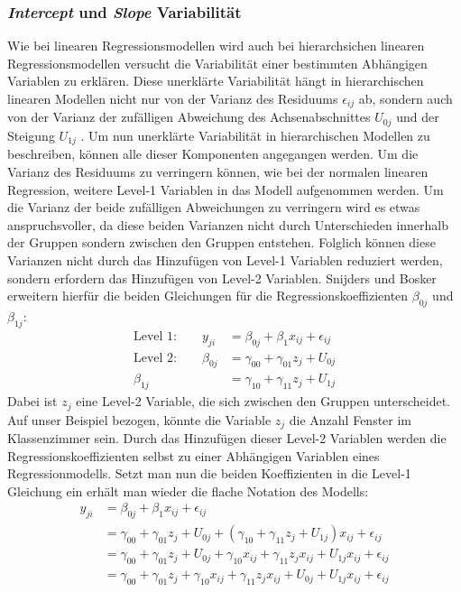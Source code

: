 \documentclass[12pt]{article}\usepackage[]{graphicx}\usepackage[]{color}
\numberwithin{equation}{section}
\begin{document}
\subsubsection{\textit{Intercept} und \textit{Slope} Variabilität}
Wie bei linearen Regressionsmodellen wird auch bei hierarchsichen linearen Regressionsmodellen versucht die Variabilität einer bestimmten Abhängigen Variablen zu erklären. Diese unerklärte Variabilität hängt in hierarchischen linearen Modellen nicht nur von der Varianz des Residuums $\epsilon_{ij}$ ab, sondern auch von der Varianz der zufälligen Abweichung des Achsenabschnittes $U_{0j}$ und der Steigung $U_{1j}$ \citep{SnijdersTomA.B2012Ma:a}. Um nun unerklärte Variabilität in hierarchischen Modellen zu beschreiben, können alle dieser Komponenten angegangen werden. Um die Varianz des Residuums zu verringern können, wie bei der normalen linearen Regression, weitere Level-1 Variablen in das Modell aufgenommen werden. Um die Varianz der beide zufälligen Abweichungen zu verringern wird es etwas anspruchsvoller, da diese beiden Varianzen nicht durch Unterschieden innerhalb der Gruppen sondern zwischen den Gruppen entstehen. Folglich können diese Varianzen nicht durch das Hinzufügen von Level-1 Variablen reduziert werden, sondern erfordern das Hinzufügen von Level-2 Variablen. Snijders und Bosker \citeyearpar{SnijdersTomA.B2012Ma:a} erweitern hierfür die beiden Gleichungen für die Regressionskoeffizienten $\beta_{0j}$ und $\beta_{1j}$:
\begin{equation} \label{eq:variance}
\begin{split}	
 \text{Level 1:}  \qquad y_{ji} & = \beta_{0j} + \beta_{1}x_{ij} + \epsilon_{ij}\\
 \text{Level 2:} \qquad \beta_{0j} & = \gamma_{00} + \gamma_{01}z_{j} + U_{0j}\\
 \beta_{1j} & = \gamma_{10} + \gamma_{11}z_{j} + U_{1j}
\end{split}	
\end{equation}
Dabei ist $z_{j}$ eine Level-2 Variable, die sich zwischen den Gruppen unterscheidet. Auf unser Beispiel bezogen, könnte die Variable $z_{j}$ die Anzahl Fenster im Klassenzimmer sein. Durch das Hinzufügen dieser Level-2 Variablen werden die Regressionskoeffizienten selbst zu einer Abhängigen Variablen eines Regressionmodells. Setzt man nun die beiden Koeffizienten in die Level-1 Gleichung ein erhält man wieder die flache Notation des Modells:
\begin{equation} \label{eq:flat_variance}
\begin{split}	
y_{ji} & = \beta_{0j} + \beta_{1}x_{ij} + \epsilon_{ij}\\
& = \gamma_{00} + \gamma_{01}z_{j} + U_{0j} + (\gamma_{10} + \gamma_{11}z_{j} + U_{1j})x_{ij} + \epsilon_{ij}\\
& = \gamma_{00} + \gamma_{01}z_{j} + U_{0j} + \gamma_{10}x_{ij} + \gamma_{11}z_{j}x_{ij} + U_{1j}x_{ij} + \epsilon_{ij}\\
& = \gamma_{00} + \gamma_{01}z_{j} + \gamma_{10}x_{ij} + \gamma_{11}z_{j}x_{ij} + U_{0j} + U_{1j}x_{ij} + \epsilon_{ij}\\
\end{split}	
\end{equation} 
\end{document}
